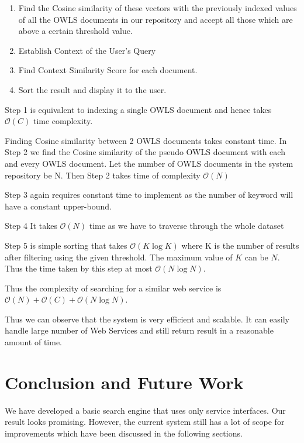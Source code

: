 \documentclass[12pt, oneside]{book}
\begin{document}
\begin{itemize}
\begin{enumerate}
  \item Find the Cosine similarity of these vectors with the previously indexed values of all the OWLS documents in our repository and accept all those which are above a certain threshold value.
  \item Establish Context of the User's Query
  \item Find Context Similarity Score for each document.
  \item Sort the result and display it to the user.
 \end{enumerate}
 Step 1 is equivalent to indexing a single OWLS document and hence takes $\mathcal{O}(C)$ time complexity. \\ \par
 Finding Cosine similarity between 2 OWLS documents takes constant time. In Step 2 we find the Cosine similarity of the pseudo OWLS document with each and every OWLS document. Let the number of OWLS documents in the system repository be N. Then Step 2 takes time of complexity $\mathcal{O}(N)$ \\ \par
 Step 3 again requires constant time to implement as the number of keyword will have a constant upper-bound. \\ \par
 Step 4 It takes $\mathcal{O}(N)$ time as we have to traverse through the whole dataset \\ \par
 Step 5 is simple sorting that takes $\mathcal{O}(K\log{K})$ where K is the number of results after filtering using the given threshold. The maximum value of $K$ can be $N$. Thus the time taken by this step at most $\mathcal{O}(N\log{N})$. \\ \par
 Thus the complexity of searching for a similar web service is $\mathcal{O}(N) + \mathcal{O}(C) + \mathcal{O}(N\log{N})$.
\end{itemize}
Thus we can observe that the system is very efficient and scalable. It can easily handle large number of Web Services and still return result in a reasonable amount of time.

\chapter{Conclusion and Future Work}
We have developed a basic search engine that uses only service interfaces. Our result looks promising. However, the current system still has a lot of scope for improvements which have been discussed in the following sections.
\end{document}
